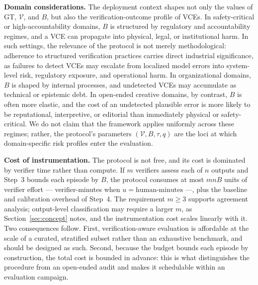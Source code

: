 \documentclass[11pt]{article}
\newcommand{\viola}[1]{\textcolor[HTML]{7030A0}{#1}}
\newcommand{\viola}[1]{#1}
\begin{document}
{\textbf{Domain considerations.} The deployment context shapes not only the values of GT, $\mathcal{V}$, and $B$, but also \viola{the verification-outcome profile of VCEs}. In safety-critical or high-accountability domains, $B$ is structured by regulatory and accountability regimes, and a VCE can propagate into physical, legal, or institutional harm. In such settings, the relevance of the protocol is not merely methodological: adherence to structured verification practices carries direct industrial significance, as failures to detect VCEs may escalate from localized model errors into system-level risk, regulatory exposure, and operational harm.
In organizational domains, $B$ is shaped by internal processes, and undetected VCEs may accumulate as technical or epistemic debt. In open-ended creative domains, by contrast, $B$ is often more elastic, and the cost of an undetected plausible error is more likely to be reputational, interpretive, or editorial than immediately physical or safety-critical. We do not claim that the framework applies uniformly across these regimes; rather, the protocol's parameters \viola{$(\mathcal{V}, B, \tau, q)$} are the loci at which domain-specific risk profiles enter the evaluation.}

\viola{\textbf{Cost of instrumentation.} The protocol is not free, and its cost is dominated by verifier time rather than compute. \viola{If $m$ verifiers assess each of $n$ outputs and Step~3 bounds each episode by $B$, the protocol consumes at most $mnB$ \viola{units of verifier effort --- verifier-minutes when $u=\text{human-minutes}$ ---}, plus the baseline and calibration overhead of Step~4. The requirement $m\ge 3$ supports agreement analysis; output-level classification may require a larger $m$, as Section~\ref{sec:concept} notes, and the instrumentation cost scales linearly with it.} Two consequences follow. First, verification-aware evaluation is affordable at the scale of a curated, stratified subset rather than an exhaustive benchmark, and should be designed as such. Second, because the budget bounds each episode by construction, the total cost is bounded in advance: this is what distinguishes the procedure from an open-ended audit and makes it schedulable within an evaluation campaign.}
\end{document}
